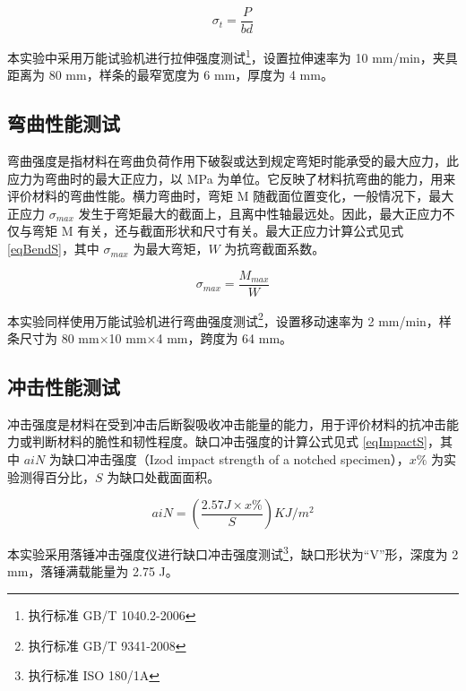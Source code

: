 \begin{equation}
    \label{eqTenS}
    \sigma_t = \frac{P}{bd}
\end{equation}

本实验中采用万能试验机进行拉伸强度测试\footnote{执行标准 GB/T 1040.2-2006}，设置拉伸速率为 10 mm/min，夹具距离为 80 mm，样条的最窄宽度为 6 mm，厚度为 4 mm。

\subsection{弯曲性能测试}
弯曲强度是指材料在弯曲负荷作用下破裂或达到规定弯矩时能承受的最大应力，此应力为弯曲时的最大正应力，以 MPa 为单位。它反映了材料抗弯曲的能力，用来评价材料的弯曲性能。横力弯曲时，弯矩 M 随截面位置变化，一般情况下，最大正应力 $\sigma_{max}$ 发生于弯矩最大的截面上，且离中性轴最远处。因此，最大正应力不仅与弯矩 M 有关，还与截面形状和尺寸有关。最大正应力计算公式见式 \eqref{eqBendS}，其中 $\sigma_{max}$ 为最大弯矩，$W$ 为抗弯截面系数。

\begin{equation}
    \label{eqBendS}
    \sigma_{max} = \frac{M_{max}}{W}
\end{equation}

本实验同样使用万能试验机进行弯曲强度测试\footnote{执行标准 GB/T 9341-2008}，设置移动速率为 2 mm/min，样条尺寸为 80 mm$\times$10 mm$\times$4 mm，跨度为 64 mm。

\subsection{冲击性能测试}
冲击强度是材料在受到冲击后断裂吸收冲击能量的能力，用于评价材料的抗冲击能力或判断材料的脆性和韧性程度。缺口冲击强度的计算公式见式 \eqref{eqImpactS}，其中 $aiN$ 为缺口冲击强度（Izod impact strength of a notched specimen），$x\%$ 为实验测得百分比，$S$ 为缺口处截面面积。

\begin{equation}
    \label{eqImpactS}
    aiN = (\frac{2.57 J \times x\%}{S}) KJ/m^2
\end{equation}

本实验采用落锤冲击强度仪进行缺口冲击强度测试\footnote{执行标准 ISO 180/1A}，缺口形状为“V”形，深度为 2 mm，落锤满载能量为 2.75 J。


